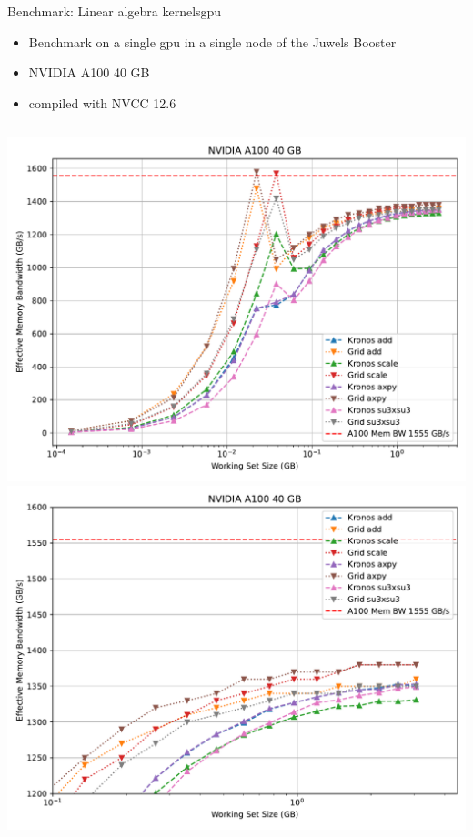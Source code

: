 \begin{frame}{Benchmark: Linear algebra kernels}{gpu}

  \begin{itemize}
    \item Benchmark on a single gpu in a single node of the Juwels Booster
    \item NVIDIA A100 40 GB
    \item compiled with NVCC 12.6
  \end{itemize}

  \begin{columns}
      \includegraphics[width=\textwidth]{figs/comparison_grid_a100.pdf}
      \includegraphics[width=\textwidth]{figs/comparison_grid_a100_zoomed.pdf}
  \end{columns}
\end{frame}

